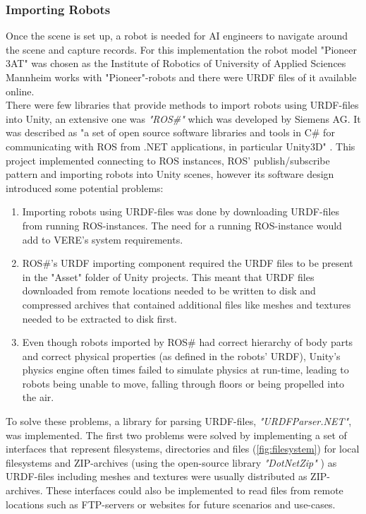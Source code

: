 \subsubsection{Importing Robots}
Once the scene is set up, a robot is needed for \acs{AI} engineers to navigate around the scene and capture records. For this implementation the robot model "Pioneer 3AT" was chosen as the Institute of Robotics of University of Applied Sciences Mannheim works with "Pioneer"-robots and there were \ac{URDF} files of it available \cite{AmrRosConfig} online.\\
There were few libraries that provide methods to import robots using URDF-files into Unity, an extensive one was \textit{"ROS\#"} which was developed by Siemens AG. It was described as "a set of open source software libraries and tools in C\# for communicating with ROS from .NET applications, in particular Unity3D" \cite{RosSharp}. This project implemented connecting to ROS instances, ROS' publish/subscribe pattern and importing robots into Unity scenes, however its software design introduced some potential problems: 
\begin{enumerate}
    \item Importing robots using URDF-files was done by downloading URDF-files from running ROS-instances. The need for a running ROS-instance would add to VERE's system requirements.
    \item ROS\#'s URDF importing component required the URDF files to be present in the "Asset" folder of Unity projects. This meant that URDF files downloaded from remote locations needed to be written to disk and compressed archives that contained additional files like meshes and textures needed to be extracted to disk first.
    \item Even though robots imported by ROS\# had correct hierarchy of body parts and correct physical properties (as defined in the robots' URDF), Unity's physics engine often times failed to simulate physics at run-time, leading to robots being unable to move, falling through floors or being propelled into the air.
\end{enumerate}
To solve these problems, a library for parsing URDF-files, \textit{"URDFParser.NET"}, was implemented. The first two problems were solved by implementing a set of interfaces that represent filesystems, directories and files (\ref{fig:filesystem}) for local filesystems and ZIP-archives (using the open-source library \textit{"DotNetZip"} \cite{DotNetZip}) as URDF-files including meshes and textures were usually distributed as ZIP-archives. These interfaces could also be implemented to read files from remote locations such as FTP-servers or websites for future scenarios and use-cases.
